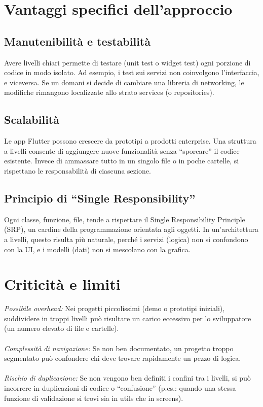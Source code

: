 \documentclass[14pt]{extbook}
\begin{document}
\section{Vantaggi specifici dell’approccio}
\subsection{Manutenibilità e testabilità}
Avere livelli chiari permette di testare (unit test o widget test) ogni porzione di codice in modo isolato. Ad esempio, i test sui servizi non coinvolgono l’interfaccia, e viceversa. Se un domani si decide di cambiare una libreria di networking, le modifiche rimangono localizzate allo strato services (o repositories).
\subsection{Scalabilità}
Le app Flutter possono crescere da prototipi a prodotti enterprise. Una struttura a livelli consente di aggiungere nuove funzionalità senza “sporcare” il codice esistente. Invece di ammassare tutto in un singolo file o in poche cartelle, si rispettano le responsabilità di ciascuna sezione.
\subsection{Principio di “Single Responsibility”}
Ogni classe, funzione, file, tende a rispettare il Single Responsibility Principle (SRP), un cardine della programmazione orientata agli oggetti. In un’architettura a livelli, questo risulta più naturale, perché i servizi (logica) non si confondono con la UI, e i modelli (dati) non si mescolano con la grafica.
\section{Criticità e limiti}
\textit{Possibile overhead:} Nei progetti piccolissimi (demo o prototipi iniziali), suddividere in troppi livelli può risultare un carico eccessivo per lo sviluppatore (un numero elevato di file e cartelle).\\\\
\textit{Complessità di navigazione:} Se non ben documentato, un progetto troppo segmentato può confondere chi deve trovare rapidamente un pezzo di logica.\\\\
\textit{Rischio di duplicazione:} Se non vengono ben definiti i confini tra i livelli, si può incorrere in duplicazioni di codice o “confusione” (p.es.: quando una stessa funzione di validazione si trovi sia in utils che in screens).
\end{document}
